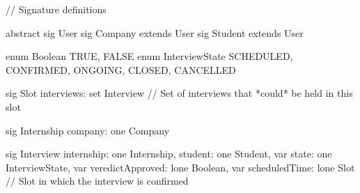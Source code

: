 // Signature definitions

abstract sig User {}
sig Company extends User {}
sig Student extends User {}

enum Boolean {TRUE, FALSE}
enum InterviewState {
	SCHEDULED,
	CONFIRMED, 
	ONGOING, 
	CLOSED, 
	CANCELLED
}

sig Slot {
	interviews: set Interview // Set of interviews that *could* be held in this slot
}

sig Internship {
	company: one Company
}

sig Interview {
	internship: one Internship,
	student: one Student,
	var state: one InterviewState,
	var veredictApproved: lone Boolean,
	var scheduledTime: lone Slot // Slot in which the interview is confirmed
}